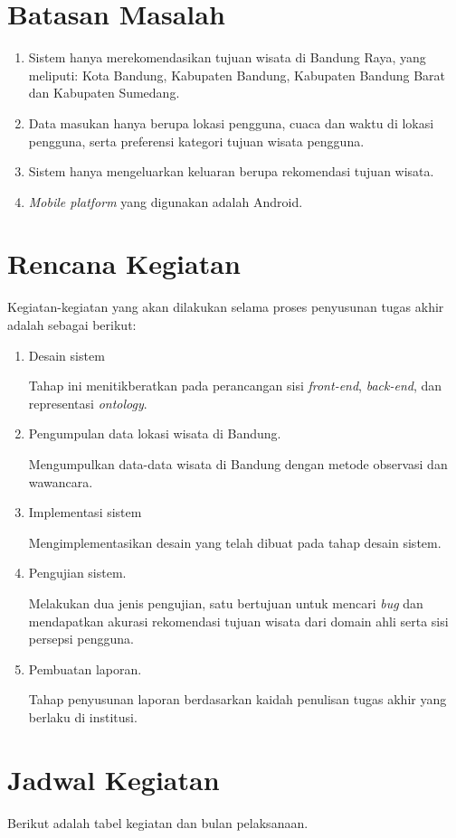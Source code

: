 \section{Batasan Masalah}
\begin{enumerate}
	\item Sistem hanya merekomendasikan tujuan wisata di Bandung Raya, yang meliputi: Kota Bandung, Kabupaten Bandung, Kabupaten Bandung Barat dan Kabupaten Sumedang.
	\item Data masukan hanya berupa lokasi pengguna, cuaca  dan waktu di lokasi pengguna, serta preferensi kategori tujuan wisata pengguna.
	\item Sistem hanya mengeluarkan keluaran berupa rekomendasi tujuan wisata.
	\item \textit{Mobile platform} yang digunakan adalah Android.
\end{enumerate}
\section{Rencana Kegiatan}
Kegiatan-kegiatan yang akan dilakukan selama proses penyusunan tugas akhir adalah sebagai berikut:
\begin{enumerate}
	\item Desain sistem
	\par
	Tahap ini menitikberatkan pada perancangan sisi \textit{front-end}, \textit{back-end}, dan representasi \textit{ontology}.
	\item Pengumpulan data lokasi wisata di Bandung.
	\par
	Mengumpulkan data-data wisata di Bandung dengan metode observasi dan wawancara.
	\item Implementasi sistem
	\par
	Mengimplementasikan desain yang telah dibuat pada tahap desain sistem.
	\item Pengujian sistem.
	\par
	Melakukan dua jenis pengujian, satu bertujuan untuk mencari \textit{bug} dan mendapatkan akurasi rekomendasi tujuan wisata dari domain ahli serta sisi 
	persepsi pengguna. 
	\item Pembuatan laporan.
	\par
	Tahap penyusunan laporan berdasarkan kaidah penulisan tugas akhir yang berlaku di institusi.
\end{enumerate}
\section{Jadwal Kegiatan}
Berikut adalah tabel kegiatan dan bulan pelaksanaan.
 

